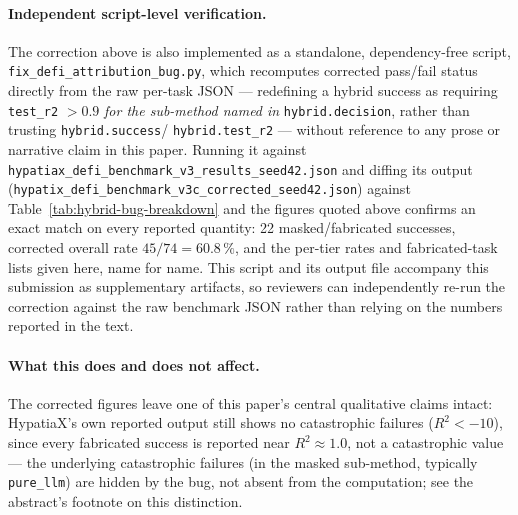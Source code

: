 \documentclass[twoside,11pt]{article}
\newcommand{\Rsq}{R^{2}}
\begin{document}
\paragraph{Independent script-level verification.} The correction above is
also implemented as a standalone, dependency-free script,
\texttt{fix\_defi\_attribution\_bug.py}, which recomputes corrected pass/fail
status directly from the raw per-task JSON --- redefining a hybrid success as
requiring \texttt{test\_r2} $> 0.9$ \emph{for the sub-method named in}
\texttt{hybrid.decision}, rather than trusting \texttt{hybrid.success}/
\texttt{hybrid.test\_r2} --- without reference to any prose or narrative
claim in this paper. Running it against
\texttt{hypatiax\_defi\_benchmark\_v3\_results\_seed42.json} and diffing its
output (\texttt{hypatix\_defi\_benchmark\_v3c\_corrected\_seed42.json}) against
Table~\ref{tab:hybrid-bug-breakdown} and the figures quoted above confirms an
exact match on every reported quantity: 22 masked/fabricated successes,
corrected overall rate $45/74=60.8\,\%$, and the per-tier rates and
fabricated-task lists given here, name for name. This script and its output
file accompany this submission as supplementary artifacts, so reviewers can
independently re-run the correction against the raw benchmark JSON rather
than relying on the numbers reported in the text.

\paragraph{What this does and does not affect.} The corrected figures leave
one of this paper's central qualitative claims intact: HypatiaX's own
reported output still shows no catastrophic failures ($\Rsq < -10$), since
every fabricated success is reported near $\Rsq \approx 1.0$, not a
catastrophic value --- the underlying catastrophic failures (in the masked
sub-method, typically \texttt{pure\_llm}) are hidden by the bug, not absent
from the computation; see the abstract's footnote on this distinction.
\end{document}
